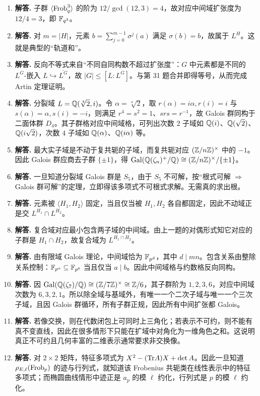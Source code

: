 \begin{enumerate}[label=\textbf{\arabic*.}, leftmargin=*, itemsep=1em]
\item \textbf{解答.} 子群 $\langle \mathrm{Frob}_q^3\rangle$ 的阶为 $12/\gcd(12,3)=4$，故对应中间域扩张度为 $12/4=3$，即 $\mathbb{F}_{q^3}$。
\item \textbf{解答.} 对 $m=|H|$，元素 $b=\sum_{j=0}^{m-1}\sigma^j(a)$ 满足 $\sigma(b)=b$，故属于 $L^H$。这就是典型的“轨道和”。
\item \textbf{解答.} 反向不等式来自“不同自同构数不超过扩张度”：$G$ 中元素都是不同的 $L^G$-嵌入 $L\hookrightarrow \overline{L^G}$，故 $|G|\le[L:L^G]$。与第 31 题合并即得等号，从而完成 Artin 定理证明。
\item \textbf{解答.} 分裂域 $L=\mathbb{Q}(\sqrt[4]{2},i)$。令 $\alpha=\sqrt[4]{2}$，取 $r(\alpha)=i\alpha,r(i)=i$ 与 $s(\alpha)=\alpha,s(i)=-i$，则满足 $r^4=s^2=1$、$srs=r^{-1}$，故 Galois 群同构于二面体群 $D_4$。其子群格对应中间域格，可列出次数 $2$ 子域如 $\mathbb{Q}(i)$、$\mathbb{Q}(\sqrt2)$、$\mathbb{Q}(i\sqrt2)$，次数 $4$ 子域如 $\mathbb{Q}(\alpha)$、$\mathbb{Q}(i\alpha)$ 等。
\item \textbf{解答.} 最大实子域是不动于复共轭的子域，而复共轭对应 $(\mathbb{Z}/n\mathbb{Z})^\times$ 中的 $-1$。因此 Galois 群应商去子群 $\{\pm1\}$，得
$\mathrm{Gal}(\mathbb{Q}(\zeta_n)^+/\mathbb{Q})\cong (\mathbb{Z}/n\mathbb{Z})^\times/\{\pm1\}$。
\item \textbf{解答.} 一旦知道分裂域 Galois 群是 $S_5$，由于 $S_5$ 不可解，按“根式可解 $\Rightarrow$ Galois 群可解”的定理，立即得该多项式不可根式求解。无需真的求出根。
\item \textbf{解答.} 元素被 $\langle H_1,H_2\rangle$ 固定，当且仅当被 $H_1,H_2$ 各自都固定，因此不动域正是交 $L^{H_1}\cap L^{H_2}$。
\item \textbf{解答.} 复合域对应最小包含两子域的中间域。由上一题的对偶形式知它对应的子群是 $H_1\cap H_2$，故复合域为 $L^{H_1\cap H_2}$。
\item \textbf{解答.} 由有限域 Galois 理论，中间域恰为 $\mathbb{F}_{p^d}$，其中 $d\mid mn$。包含关系由整除关系控制：$\mathbb{F}_{p^a}\subseteq \mathbb{F}_{p^b}$ 当且仅当 $a\mid b$。因此中间域格与约数格反向同构。
\item \textbf{解答.} 因 $\mathrm{Gal}(\mathbb{Q}(\zeta_7)/\mathbb{Q})\cong (\mathbb{Z}/7\mathbb{Z})^\times\cong \mathbb{Z}/6$，其子群阶为 $1,2,3,6$，对应中间域次数为 $6,3,2,1$。所以除全域与基域外，有唯一一个二次子域与唯一一个三次子域，且因 Galois 群循环，所有子群正规，因此所有中间扩张都 Galois。
\item \textbf{解答.} 若像交换，则在代数闭包上可同时上三角化；若表示不可约，则不能有真不变直线，因此在很多情形下只能在扩域中对角化为一维角色之和。这说明真正不可约且几何丰富的二维表示通常要求非交换像。
\item \textbf{解答.} 对 $2\times2$ 矩阵，特征多项式为 $X^2-(\mathrm{Tr} A)X+\det A$。因此一旦知道 $\rho_{E,\ell}(\mathrm{Frob}_p)$ 的迹与行列式，就知道该 Frobenius 共轭类在线性表示中的特征多项式；而椭圆曲线情形中迹正是 $a_p$ 的模 $\ell$ 约化，行列式是 $p$ 的模 $\ell$ 约化。
\end{enumerate}

